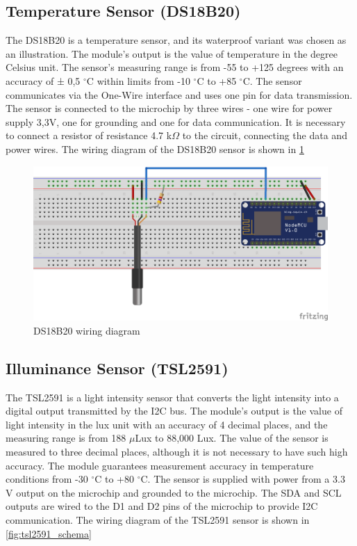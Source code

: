 \subsection{Temperature Sensor (DS18B20)}

The DS18B20 \citep{DS18B20_Datasheet} is a temperature sensor, and its waterproof variant was chosen as an illustration.  The module's output is the value of temperature in the degree Celsius unit. The sensor's measuring range is from -55 to +125 degrees with an accuracy of ± 0,5 $^{\circ}$C within limits from -10 $^{\circ}$C to +85 $^{\circ}$C. The sensor communicates via the One-Wire interface and uses one pin for data transmission. The sensor is connected to the microchip by three wires - one wire for power supply 3,3V, one for grounding and one for data communication. It is necessary to connect a resistor of resistance 4.7 k$\Omega$ to the circuit, connecting the data and power wires. The wiring diagram of the DS18B20 sensor is shown in \cref{fig:ds18b20_schema}

\begin{figure}[H]
	\centering
	\includegraphics[width=\textwidth]{img/ds18b20_schema.png}
	\caption{DS18B20 wiring diagram}
	\label{fig:ds18b20_schema}
\end{figure}

\subsection{Illuminance Sensor (TSL2591)}

The TSL2591 \citep{TSL2591_Datasheet} is a light intensity sensor that converts the light intensity into a digital output transmitted by the I2C bus. The module's output is the value of light intensity in the lux unit with an accuracy of 4 decimal places, and the measuring range is from 188 $\mu$Lux to 88,000 Lux. The value of the sensor is measured to three decimal places, although it is not necessary to have such high accuracy. The module guarantees measurement accuracy in temperature conditions from -30 $^{\circ}$C to +80 $^{\circ}$C. The sensor is supplied with power from a 3.3 V output on the microchip and grounded to the microchip. The SDA and SCL outputs are wired to the D1 and D2 pins of the microchip to provide I2C communication. The wiring diagram of the TSL2591 sensor is shown in \cref{fig:tsl2591_schema}

